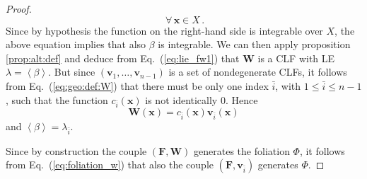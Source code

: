 \documentclass[10pt,a4paper]{amsart}
\newcommand{\vect}[1]{\boldsymbol{#1}}
\begin{document}
\begin{proof}
\begin{equation}
\ \forall\, \vect{x}\in X\,.
\end{equation}
Since by hypothesis the function on the right-hand side
is integrable over $X$, the above equation
implies that also $\beta$ is integrable. We can then apply proposition
\ref{prop:alt:def} and deduce from Eq.~(\ref{eq:lie_fw1}) that
$\vect{W}$ is a CLF with LE $\lambda=\left<\beta\right>$. But since 
$\left(\vect{v}_1, \dots, \vect{v}_{n-1}\right)$ is a
set of nondegenerate CLFs, it follows from Eq.~(\ref{eq:geo:def:W})
that there must be only one index $\bar i$,
with $1\leq \bar i\leq n-1$, such that the function $c_{\bar i} (\vect{x})$
is not identically 0. Hence 
\begin{equation} \label{eq:foliation_w}
    \vect{W}(\vect{x}) = c_{\bar i} (\vect{x})
\vect{v}_{\bar i} (\vect{x})
  \end{equation}
and $\left<\beta\right>=\lambda_{\bar i}$. 

Since by construction the couple $(\vect{F},\vect{W})$ generates the
foliation $\Phi$, it follows from Eq.~(\ref{eq:foliation_w}) that
also the couple $(\vect{F},\vect{v}_{\bar i})$ generates $\Phi$.
\end{proof}
\end{document}
